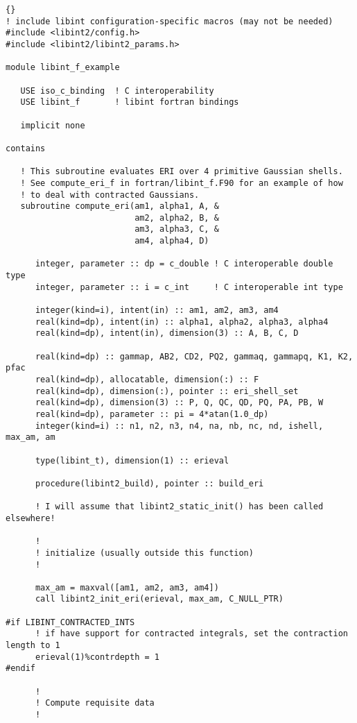 \documentclass[10pt]{article}
\begin{document}
\begin{lstlisting}[label=lst:usefortran, caption=Using \LIBINT\ from Fortran.]{}
! include libint configuration-specific macros (may not be needed)
#include <libint2/config.h>
#include <libint2/libint2_params.h>

module libint_f_example

   USE iso_c_binding  ! C interoperability
   USE libint_f       ! libint fortran bindings

   implicit none

contains

   ! This subroutine evaluates ERI over 4 primitive Gaussian shells.
   ! See compute_eri_f in fortran/libint_f.F90 for an example of how
   ! to deal with contracted Gaussians.
   subroutine compute_eri(am1, alpha1, A, &
                          am2, alpha2, B, &
                          am3, alpha3, C, &
                          am4, alpha4, D)

      integer, parameter :: dp = c_double ! C interoperable double type
      integer, parameter :: i = c_int     ! C interoperable int type

      integer(kind=i), intent(in) :: am1, am2, am3, am4
      real(kind=dp), intent(in) :: alpha1, alpha2, alpha3, alpha4
      real(kind=dp), intent(in), dimension(3) :: A, B, C, D

      real(kind=dp) :: gammap, AB2, CD2, PQ2, gammaq, gammapq, K1, K2, pfac
      real(kind=dp), allocatable, dimension(:) :: F
      real(kind=dp), dimension(:), pointer :: eri_shell_set
      real(kind=dp), dimension(3) :: P, Q, QC, QD, PQ, PA, PB, W
      real(kind=dp), parameter :: pi = 4*atan(1.0_dp)
      integer(kind=i) :: n1, n2, n3, n4, na, nb, nc, nd, ishell, max_am, am

      type(libint_t), dimension(1) :: erieval

      procedure(libint2_build), pointer :: build_eri

      ! I will assume that libint2_static_init() has been called elsewhere!

      !
      ! initialize (usually outside this function)
      !

      max_am = maxval([am1, am2, am3, am4])
      call libint2_init_eri(erieval, max_am, C_NULL_PTR)

#if LIBINT_CONTRACTED_INTS
      ! if have support for contracted integrals, set the contraction length to 1
      erieval(1)%contrdepth = 1
#endif

      !
      ! Compute requisite data
      !


\end{lstlisting}
\end{document}
